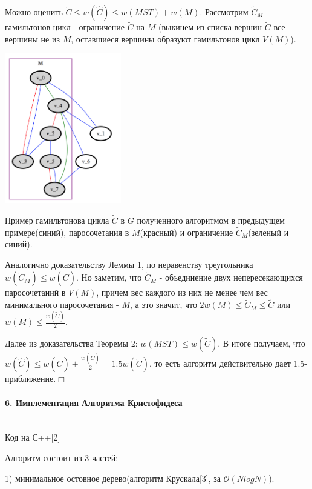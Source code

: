 \documentclass[14pt]{article}
\begin{document}
    Можно оценить $\tilde{C} \leq w(\hat{C}) \leq w(MST) + w(M)$.
    Рассмотрим $\tilde{C}_M$ гамильтонов цикл  - ограничение $\tilde{C}$ на $M$ (выкинем из списка вершин $\tilde{C}$ все вершины не из $M$, оставшиеся вершины образуют гамильтонов цикл $V(M)$). 

    \begin{center} 
    \includegraphics[width=2in]{4.png}

    \caption{Пример гамильтонова цикла $\tilde{C}$ в $G$ полученного алгоритмом в предыдущем примере(синий), паросочетания в $M$(красный) и ограничение $\tilde{C}_M$(зеленый и синий).}
    \end{center}

    Аналогично доказательству Леммы 1, по неравенству треугольника  $w(\tilde{C}_M) \leq w(\tilde{C})$. Но заметим, что $\tilde{C}_M$ - объединение двух непересекающихся паросочетаний в $V(M)$,  причем вес каждого из них не менее чем вес минимального паросочетания - $M$, а это значит, что $2w(M) \leq \tilde{C}_M \leq \tilde{C}$ или $w(M) \leq \frac{w(\tilde{C})}{2}$.

    Далее из доказательства Теоремы 2: $w(MST) \leq w(\tilde{C})$. 
    В итоге получаем, что $w(\hat{C}) \leq w(\tilde{C}) + \frac{w(\tilde{C})}{2} = 1.5 w(\tilde{C})$, то есть алгоритм действительно дает 1.5-приближение$.\Box$

  

    \paragraph{\large{6. Имплементация Алгоритма Кристофидеса}}\mbox{}\\

     Код на С++[2]

     Алгоритм состоит из 3 частей:

     1)  минимальное остовное дерево(алгоритм Крускала[3], 
     за $\mathcal{O}(NlogN)$).
\end{document}

